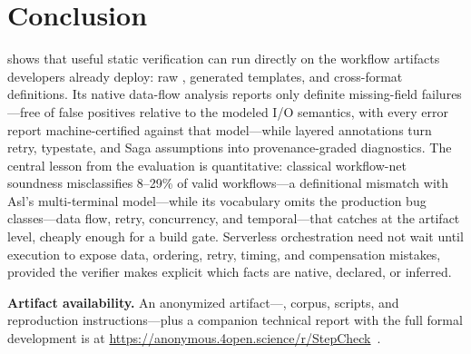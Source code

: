 \section{Conclusion}
\label{sec:concl}

\tool{} shows that useful static verification can run directly on the workflow artifacts developers
already deploy: raw \asl{}, generated templates, and cross-format definitions. Its native data-flow
analysis reports only definite missing-field failures---free of false positives relative to the modeled I/O semantics, with every error report machine-certified against that model---while layered annotations turn retry,
typestate, and Saga assumptions into provenance-graded diagnostics. The central lesson from the
evaluation is quantitative: classical workflow-net soundness misclassifies 8–29\% of valid workflows—a definitional mismatch with Asl's multi-terminal model—while its vocabulary omits the production bug classes---data flow, retry, concurrency, and
temporal---that \tool{} catches at the artifact level, cheaply enough for a build gate.
Serverless orchestration need not wait until execution to expose data,
ordering, retry, timing, and compensation mistakes, provided the
verifier makes explicit which facts are native, declared, or inferred.

\textbf{Artifact availability.} An anonymized artifact---\tool{}, corpus,
scripts, and reproduction instructions---plus a companion technical report
with the full formal development is at
\url{https://anonymous.4open.science/r/StepCheck}~\cite{stepcheck-repo}.

